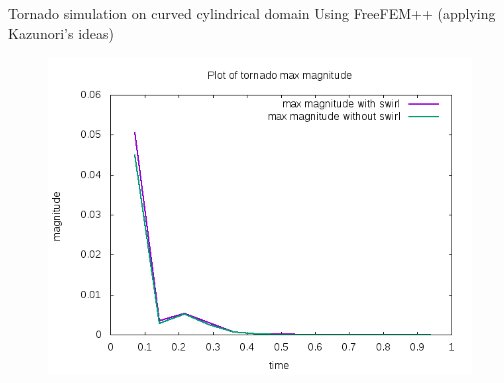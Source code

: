 \documentclass{beamer}
\begin{document}
\begin{frame}{Tornado simulation on curved cylindrical domain}
Using FreeFEM++ (applying Kazunori's ideas)
\begin{figure}
	\centering
	\includegraphics[width=1\linewidth]{NS_3D/curved}
	\caption{}
	\label{fig:curved}
\end{figure}

\end{frame}
\end{document}
